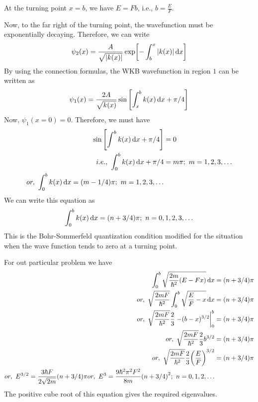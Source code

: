 \begin{enumerate}
	At the turning point $x=b$, we have $E= F b$, i.e., $b=\frac{E}{F}$.
	
	Now, to the far right of the turning point, the wavefunction must be exponentially decaying. Therefore, we can write
	\begin{equation*}
		\psi_2(x) = \frac{A}{\sqrt{\abs{k(x)}}} \exp[-\int_{b}^{x} \abs{k(x)} \dd{x}]
	\end{equation*}
	By using the connection formulas, the WKB wavefunction in region $1$ can be written as
	\begin{equation}
		\psi_1(x) = \frac{2 A}{\sqrt{k(x)}} \sin\qty[\int_{x}^{b} k(x) \dd{x} + \pi/4]
	\end{equation}
	Now, $\psi_1(x=0) = 0$.  Therefore, we must have
	\begin{align*}
		\sin\qty[\int_{}^{b} k(x) \dd{x} + \pi/4] &= 0\\
		i.e., \ \int_{0}^{b} k(x) \dd{x} + \pi/4 &= m \pi;\ m = 1,2,3,\ldots \\
		or, \ \int_{0}^{b} k(x) \dd{x} = \qty(m - 1/4) \pi ;\ m = 1,2,3,\ldots
	\end{align*}
	We can write this equation as
	\begin{equation}
		\int_{0}^{b} k(x) \dd{x} = \qty(n + 3/4) \pi ;\ n = 0,1,2,3,\ldots
	\end{equation}
	This is the Bohr-Sommerfeld quantization condition modified for the situation when the wave function tends to zero at a turning point.
	
	For out particular problem we have
	\begin{align*}
		\int_{0}^{b} \sqrt{\frac{2 m}{\hbar^2} (E - F x)} \dd{x} &= \qty(n + 3/4) \pi \\
		or,\ \sqrt{\frac{2 m F}{\hbar^2}} \int_{0}^{b} \sqrt{\frac{E}{F} - x} \dd{x} &= \qty(n + 3/4) \pi \\
		or,\ \sqrt{\frac{2 m F}{\hbar^2}} \frac{2}{3} \eval{-(b-x)^{3/2}}_{0}^{b} &= \qty(n + 3/4) \pi \\
		or,\ \sqrt{\frac{2 m F}{\hbar^2}} \frac{2}{3} b^{3/2} &= \qty(n + 3/4) \pi \\
		or,\ \sqrt{\frac{2 m F}{\hbar^2}} \frac{2}{3} \qty(\frac{E}{F})^{3/2} &= \qty(n + 3/4) \pi \\
		or,\ E^{3/2} = \frac{3 \hbar F}{2 \sqrt{2 m}} \qty(n + 3/4) \pi
		or,\ E^{3} = \frac{9 \hbar^2 \pi^2 F^2}{8 m} \qty(n + 3/4)^2;\ n=0,1,2,\ldots 
	\end{align*}
	The positive cube root of this equation gives the required eigenvalues.
	

\end{enumerate}
